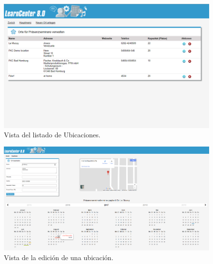 \begin{figure}[h]
	\begin{center}
		\includegraphics[width=\textwidth]{screenshots/listar_ubicaciones.png}
		\caption{Vista del listado de Ubicaciones.} \label{fig:listarUbicaciones}
	\end{center}
\end{figure}

\begin{figure}[h]
	\begin{center}
		\includegraphics[width=\textwidth]{screenshots/edicion_ubicacion.png}
		\caption{Vista de la edición de una ubicación.} \label{fig:editarUbicaciones}
	\end{center}
\end{figure}

